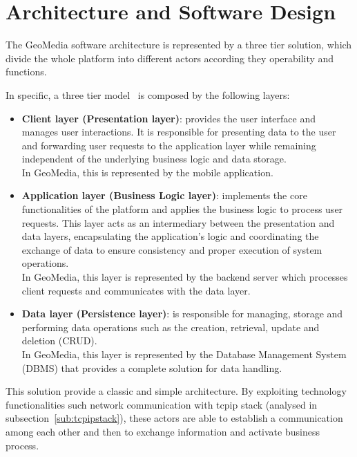 \chapter{Architecture and Software Design}
\label{cap:architecture}
The GeoMedia software architecture is represented by a three tier solution, which divide the whole platform into different actors according they operability and functions.

In specific, a three tier model~\cite{article:three-tier} is composed by the following layers:

\begin{itemize}
    \item \textbf{Client layer (Presentation layer)}: provides the user interface and manages user interactions. It is responsible for presenting data to the user and forwarding user requests to the application layer while remaining independent of the underlying business logic and data storage. \\
    In GeoMedia, this is represented by the mobile application.
    
    \item \textbf{Application layer (Business Logic layer)}: implements the core functionalities of the platform and applies the business logic to process user requests. This layer acts as an intermediary between the presentation and data layers, encapsulating the application's logic and coordinating the exchange of data to ensure consistency and proper execution of system operations.\\
    In GeoMedia, this layer is represented by the backend server which processes client requests and communicates with the data layer.

    \item \textbf{Data layer (Persistence layer)}: is responsible for managing, storage and performing data operations such as the creation, retrieval, update and deletion (CRUD). \\
    In GeoMedia, this layer is represented by the Database Management System (DBMS) that provides a complete solution for data handling.
    
\end{itemize}

This solution provide a classic and simple architecture. By exploiting technology functionalities such network communication with \acrshort{tcpip} stack (analysed in subsection~\ref{sub:tcpipstack}), these actors are able to establish a communication among each other and then to exchange information and activate business process.

